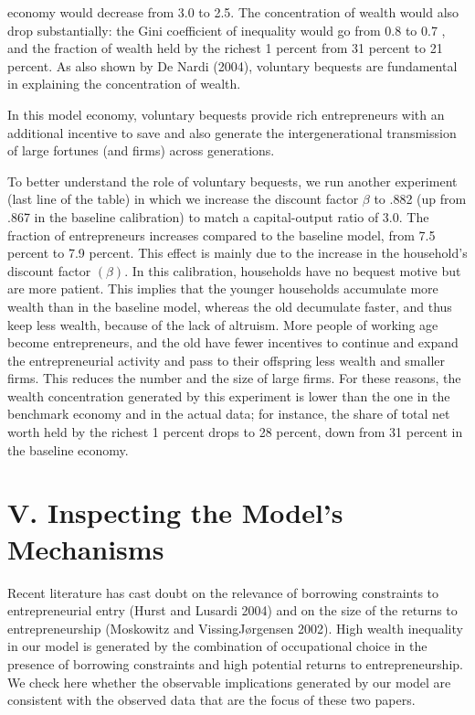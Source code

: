 \documentclass[10pt]{article}
\begin{document}
economy would decrease from 3.0 to 2.5. The concentration of wealth would also drop substantially: the Gini coefficient of inequality would go from 0.8 to 0.7 , and the fraction of wealth held by the richest 1 percent from 31 percent to 21 percent. As also shown by De Nardi (2004), voluntary bequests are fundamental in explaining the concentration of wealth.

In this model economy, voluntary bequests provide rich entrepreneurs with an additional incentive to save and also generate the intergenerational transmission of large fortunes (and firms) across generations.

To better understand the role of voluntary bequests, we run another experiment (last line of the table) in which we increase the discount factor $\beta$ to .882 (up from .867 in the baseline calibration) to match a capital-output ratio of 3.0. The fraction of entrepreneurs increases compared to the baseline model, from 7.5 percent to 7.9 percent. This effect is mainly due to the increase in the household's discount factor $(\beta)$. In this calibration, households have no bequest motive but are more patient. This implies that the younger households accumulate more wealth than in the baseline model, whereas the old decumulate faster, and thus keep less wealth, because of the lack of altruism. More people of working age become entrepreneurs, and the old have fewer incentives to continue and expand the entrepreneurial activity and pass to their offspring less wealth and smaller firms. This reduces the number and the size of large firms. For these reasons, the wealth concentration generated by this experiment is lower than the one in the benchmark economy and in the actual data; for instance, the share of total net worth held by the richest 1 percent drops to 28 percent, down from 31 percent in the baseline economy.

\section*{V. Inspecting the Model's Mechanisms}
Recent literature has cast doubt on the relevance of borrowing constraints to entrepreneurial entry (Hurst and Lusardi 2004) and on the size of the returns to entrepreneurship (Moskowitz and VissingJørgensen 2002). High wealth inequality in our model is generated by the combination of occupational choice in the presence of borrowing constraints and high potential returns to entrepreneurship. We check here whether the observable implications generated by our model are consistent with the observed data that are the focus of these two papers.
\end{document}
